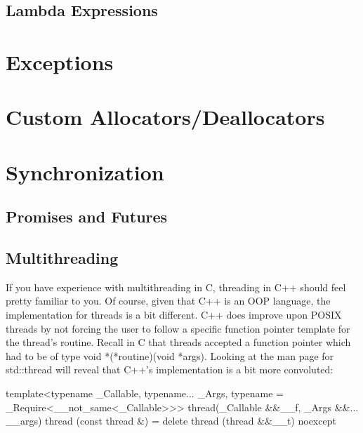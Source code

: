 \documentclass{article}
\begin{document}
\subsection{Lambda Expressions}

\section{Exceptions}

\section{Custom Allocators/Deallocators}

\section{Synchronization}

\subsection{Promises and Futures}

\subsection{Multithreading}

If you have experience with multithreading in C, threading in C++ should feel pretty familiar to you. Of
course, given that C++ is an OOP language, the implementation for threads is a bit different. C++ does
improve upon POSIX threads by not forcing the user to follow a specific function pointer template for the
thread's routine. Recall in C that threads accepted a function pointer which had to be of type
void *(*routine)(void *args). Looking at the man page for std::thread will reveal that C++'s implementation
is a bit more convoluted:

\begin{cpplst}
template<typename _Callable, typename... _Args, typename = _Require<__not_same<_Callable>>>
thread(_Callable &&__f, _Args &&... __args)
thread (const thread &) = delete
thread (thread &&__t) noexcept
\end{cpplst}
\end{document}
